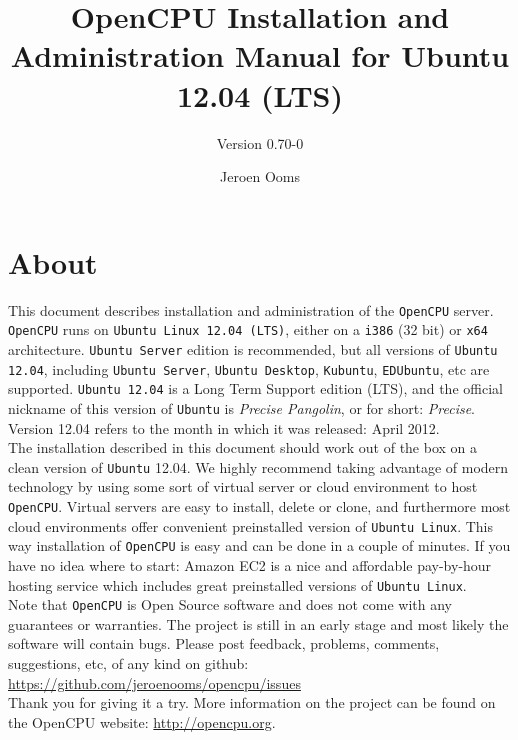 \documentclass{scrartcl}
\author{Jeroen Ooms}
\title{OpenCPU Installation and Administration Manual for Ubuntu 12.04
(LTS)}
\subtitle{Version 0.70-0}
\begin{document}
\maketitle

\section*{About}

\noindent This document describes installation and administration of the \texttt{OpenCPU}
server. \texttt{OpenCPU} runs on \texttt{Ubuntu Linux 12.04 (LTS)}, either on a
\texttt{i386} (32 bit) or \texttt{x64} architecture. \texttt{Ubuntu Server}
edition is recommended, but all versions of \texttt{Ubuntu 12.04}, including
\texttt{Ubuntu Server}, \texttt{Ubuntu Desktop}, \texttt{Kubuntu},
\texttt{EDUbuntu}, etc are supported. \texttt{Ubuntu 12.04} is a Long Term
Support edition (LTS), and the official nickname of this version of
\texttt{Ubuntu} is \emph{Precise Pangolin}, or for short: \emph{Precise}.
Version 12.04 refers to the month in which it was released: April 2012.\\

The installation described in this document should work out of the box on a
clean version of \texttt{Ubuntu} 12.04. We highly recommend taking advantage of
modern technology by using some sort of virtual server or cloud environment to
host \texttt{OpenCPU}. Virtual servers are easy to install, delete or clone, and
furthermore most cloud environments offer convenient preinstalled version of
\texttt{Ubuntu Linux}. This way installation of \texttt{OpenCPU} is easy and can
be done in a couple of minutes. If you have no idea where to start: Amazon EC2
is a nice and affordable pay-by-hour hosting service which includes great
preinstalled versions of \texttt{Ubuntu Linux}.\\

Note that \texttt{OpenCPU} is Open Source software and does not
come with any guarantees or warranties. The project is still in an early stage
and most likely the software will contain bugs. Please post feedback, problems,
comments, suggestions, etc, of any kind on github: \\

\url{https://github.com/jeroenooms/opencpu/issues} \\

Thank you for giving it a try. More information on the project can be found on
the OpenCPU website: \url{http://opencpu.org}.
\end{document}
